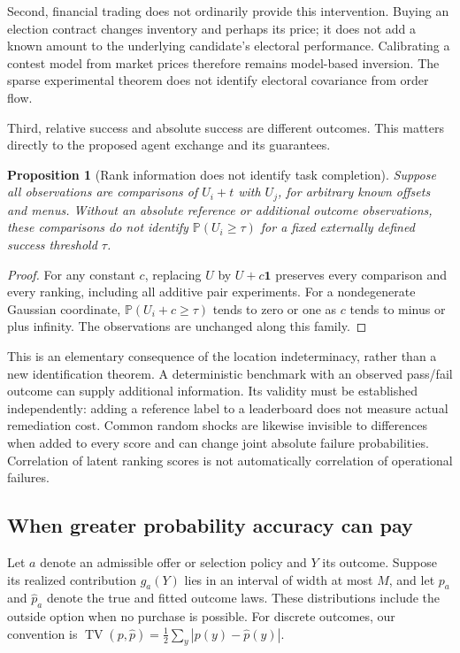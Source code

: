 \documentclass[11pt]{article}
\newcommand{\Prob}{\mathbb P}
\newcommand{\one}{\mathbf 1}
\newcommand{\TV}{\operatorname{TV}}
\newtheorem{proposition}{Proposition}
\theoremstyle{remark}\newtheorem{example}{Example}
\begin{document}
Second, financial trading does not ordinarily provide this intervention. Buying
an election contract changes inventory and perhaps its price; it does not add
a known amount to the underlying candidate's electoral performance. Calibrating
a contest model from market prices therefore remains model-based inversion.
The sparse experimental theorem does not identify electoral covariance from
order flow.

Third, relative success and absolute success are different outcomes. This
matters directly to the proposed agent exchange and its guarantees.

\begin{proposition}[Rank information does not identify task completion]
Suppose all observations are comparisons of $U_i+t$ with $U_j$, for arbitrary
known offsets and menus. Without an absolute reference or additional outcome
observations, these comparisons do not identify
$\Prob(U_i\geq\tau)$ for a fixed externally defined success threshold $\tau$.
\end{proposition}
\begin{proof}
For any constant $c$, replacing $U$ by $U+c\one$ preserves every comparison
and every ranking, including all additive pair experiments. For a nondegenerate
Gaussian coordinate, $\Prob(U_i+c\geq\tau)$ tends to zero or one as $c$ tends
to minus or plus infinity. The observations are unchanged along this family.
\end{proof}

This is an elementary consequence of the location indeterminacy, rather than
a new identification theorem. A deterministic benchmark with an observed
pass/fail outcome can supply additional information. Its validity must be
established independently: adding a reference label to a leaderboard does not
measure actual remediation cost. Common random shocks are likewise invisible
to differences when added to every score and can change joint absolute
failure probabilities. Correlation of latent ranking scores is not automatically
correlation of operational failures.

\subsection{When greater probability accuracy can pay}
Let $a$ denote an admissible offer or selection policy and $Y$ its outcome.
Suppose its realized contribution $g_a(Y)$ lies in an interval of width at most
$M$, and let $p_a$ and $\widehat p_a$ denote the true and fitted outcome laws.
These distributions include the outside option when no purchase is possible.
For discrete outcomes, our convention is
$\TV(p,\widehat p)=\tfrac12\sum_y|p(y)-\widehat p(y)|$.
\end{document}
